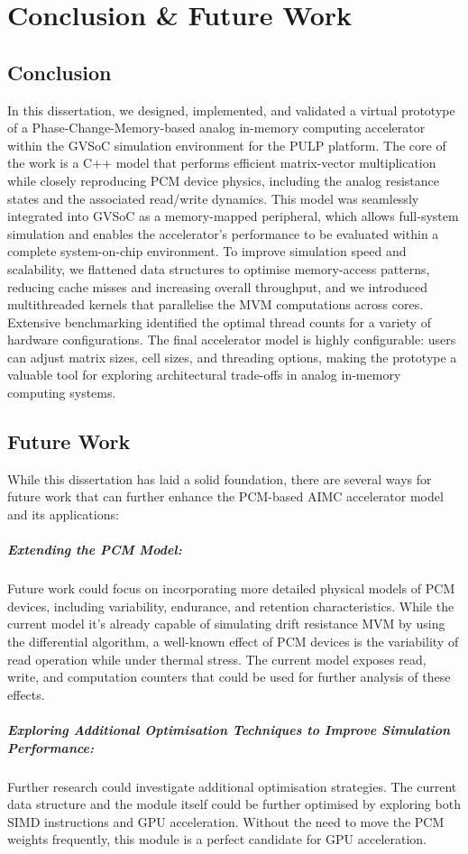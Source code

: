 \chapter{Conclusion \& Future Work}\label{chap:conclusion}
\section{Conclusion}\label{sec:res_sum}
In this dissertation, we designed, implemented, and validated a virtual prototype of a Phase-Change-Memory-based analog in-memory computing accelerator within the GVSoC simulation environment for the PULP platform. 
The core of the work is a C++ model that performs efficient matrix-vector multiplication while closely reproducing PCM device physics, including the analog resistance states and the associated read/write dynamics. 
This model was seamlessly integrated into GVSoC as a memory-mapped peripheral, which allows full-system simulation and enables the accelerator's performance to be evaluated within a complete system-on-chip environment. 
To improve simulation speed and scalability, we flattened data structures to optimise memory-access patterns, reducing cache misses and increasing overall throughput, and we introduced multithreaded kernels that parallelise the MVM computations across cores. 
Extensive benchmarking identified the optimal thread counts for a variety of hardware configurations. 
The final accelerator model is highly configurable: users can adjust matrix sizes, cell sizes, and threading options, making the prototype a valuable tool for exploring architectural trade-offs in analog in-memory computing systems.
\section{Future Work}\label{sec:future_work}
While this dissertation has laid a solid foundation, there are several ways for future work that can further enhance the PCM-based AIMC accelerator model and its applications:

\paragraph{Extending the PCM Model:} Future work could focus on incorporating more detailed physical models of PCM devices,
  including variability, endurance, and retention characteristics. While the current model it's already capable of simulating drift resistance MVM by using the differential algorithm, a well-known effect of PCM devices is the variability of read operation while under thermal stress. The current model exposes read, write, and computation counters that could be used for further analysis of these effects.
  
\paragraph{Exploring Additional Optimisation Techniques to Improve Simulation Performance:} Further research could investigate additional optimisation strategies.
The current data structure and the module itself could be further optimised by exploring both SIMD instructions and GPU acceleration.
Without the need to move the PCM weights frequently, this module is a perfect candidate for GPU acceleration.
